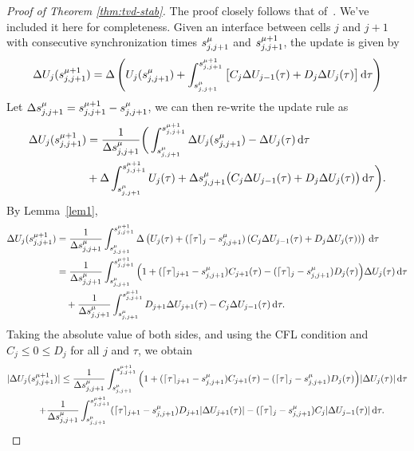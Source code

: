 \begin{proof}[Proof of Theorem \ref{thm:tvd-stab}]
The proof closely follows that of~\cite{Kirby2003}. We've included it here for completeness.
Given an interface between cells $j$ and $j+1$ with consecutive synchronization times $s^{\mu}_{j,j+1}$ and $s^{\mu+1}_{j,j+1}$, the update is given by
\begin{equation*}
\Delta U_j (s^{\mu+1}_{j,j+1}) = \Delta \left( U_j(s^{\mu}_{j,j+1}) + \int_{s^{\mu}_{j,j+1}}^{s^{\mu+1}_{j,j+1}} \big[ C_j \Delta U_{j-1} (\tau) + D_j \Delta U_{j} (\tau) \big] \,\mathrm{d} \tau \right)
\end{equation*}
Let $\Delta s^{\mu}_{j,j+1} = s^{\mu+1}_{j,j+1} - s^{\mu}_{j,j+1}$, we can then re-write the update rule as
\begin{align*}
\Delta U_j (s^{\mu+1}_{j,j+1} ) &= \frac{1}{\Delta s^{\mu}_{j,j+1}} \bigg( \int_{s^{\mu}_{j,j+1}}^{s^{\mu+1}_{j,j+1}} \Delta U_j(s^{\mu}_{j,j+1}) - \Delta U_j(\tau) \,\mathrm{d} \tau \\
& + \Delta \int_{s^{\mu}_{j,j+1}}^{s^{\mu+1}_{j,j+1}} U_j(\tau) + \Delta s^{\mu}_{j,j+1} \big( C_j \Delta U_{j-1}(\tau) + D_j \Delta U_j(\tau) \big) \,\mathrm{d} \tau \bigg). \\
\end{align*}
By Lemma~\ref{lem1},
\begin{align*}
\Delta U_j (s^{\mu+1}_{j,j+1} ) &= \frac{1}{\Delta s^{\mu}_{j,j+1}} \int_{s^{\mu}_{j,j+1}}^{s^{\mu+1}_{j,j+1}} 
\Delta \left( U_j(\tau) +  (\lceil \tau \rceil_j - s^{\mu}_{j,j+1} ) \left( C_j \Delta U_{j-1}(\tau) + D_j \Delta U_j(\tau) \right) \right)\,\mathrm{d} \tau\\
&= \frac{1}{\Delta s^{\mu}_{j,j+1}} \int_{s^{\mu}_{j,j+1}}^{s^{\mu+1}_{j,j+1}} \Big( 1 + ( \lceil \tau \rceil_{j+1} - s^{\mu}_{j,j+1} ) C_{j+1}(\tau) - ( \lceil \tau \rceil_j - s^{\mu}_{j,j+1} ) D_{j}(\tau) \Big) \Delta U_j(\tau) \,\mathrm{d} \tau\\
&\quad + \frac{1}{\Delta s^{\mu}_{j,j+1}} \int_{s^{\mu}_{j,j+1}}^{s^{\mu+1}_{j,j+1}} D_{j+1} \Delta U_{j+1}(\tau) - C_j \Delta U_{j-1} (\tau) \,\mathrm{d} \tau.
\end{align*}
Taking the absolute value of both sides, and using the CFL condition and $C_j \le 0 \le D_j$ for all $j$ and $\tau$, we obtain
\begin{multline}  \label{eq:thm1-pfa}
|\Delta U_j (\ssyncnext)| \le \frac{1}{\Delta \ssync} \int_{\ssync}^{\ssyncnext} \Big( 1 + ( \lceil \tau \rceil_{j+1} - \ssync ) C_{j+1}(\tau) - ( \lceil \tau \rceil_j - \ssync ) D_{j}(\tau) \Big) |\Delta U_j(\tau)| \,\mathrm{d} \tau\\
\quad + \frac{1}{\Delta \ssync} \int_{\ssync}^{\ssyncnext} ( \lceil \tau \rceil_{j+1} - \ssync )D_{j+1} |\Delta U_{j+1}(\tau)| - ( \lceil \tau \rceil_j - \ssync ) C_j |\Delta U_{j-1} (\tau)| \,\mathrm{d} \tau.

\end{multline}
\end{proof}
